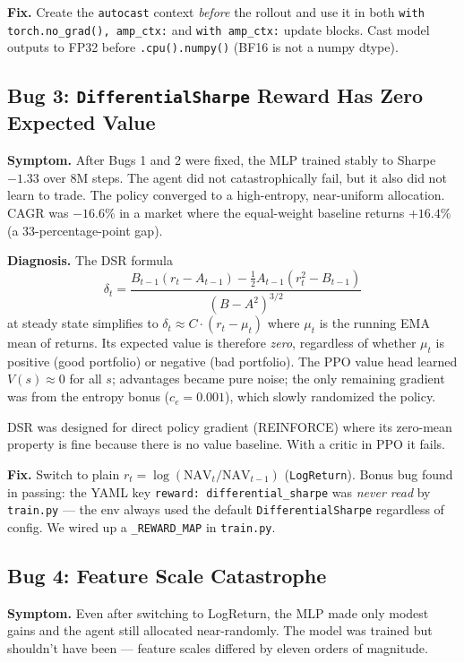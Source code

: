\documentclass[11pt,a4paper]{article}
\begin{document}
\textbf{Fix.} Create the \texttt{autocast} context \emph{before} the rollout and
use it in both \texttt{with torch.no\_grad(), amp\_ctx:} and \texttt{with amp\_ctx:}
update blocks. Cast model outputs to FP32 before \texttt{.cpu().numpy()} (BF16 is
not a numpy dtype).

\subsection{Bug 3: \texttt{DifferentialSharpe} Reward Has Zero Expected Value}

\textbf{Symptom.} After Bugs 1 and 2 were fixed, the MLP trained stably to
Sharpe $-1.33$ over 8M steps. The agent did not catastrophically fail, but it
also did not learn to trade. The policy converged to a high-entropy, near-uniform
allocation. CAGR was $-16.6\%$ in a market where the equal-weight baseline returns
$+16.4\%$ (a 33-percentage-point gap).

\textbf{Diagnosis.} The DSR formula
\[ \delta_t = \frac{B_{t-1} (r_t - A_{t-1}) - \tfrac{1}{2} A_{t-1} (r_t^2 - B_{t-1})}{(B - A^2)^{3/2}} \]
at steady state simplifies to $\delta_t \approx C \cdot (r_t - \mu_t)$ where $\mu_t$
is the running EMA mean of returns. Its expected value is therefore \emph{zero},
regardless of whether $\mu_t$ is positive (good portfolio) or negative (bad
portfolio). The PPO value head learned $V(s) \approx 0$ for all $s$; advantages
became pure noise; the only remaining gradient was from the entropy bonus
($c_e = 0.001$), which slowly randomized the policy.

DSR was designed for direct policy gradient (REINFORCE) where its zero-mean
property is fine because there is no value baseline. With a critic in PPO it
fails.

\textbf{Fix.} Switch to plain $r_t = \log(\text{NAV}_t / \text{NAV}_{t-1})$
(\texttt{LogReturn}). Bonus bug found in passing: the YAML key \texttt{reward:
differential\_sharpe} was \emph{never read} by \texttt{train.py} --- the env
always used the default \texttt{DifferentialSharpe} regardless of config. We wired
up a \texttt{\_REWARD\_MAP} in \texttt{train.py}.

\subsection{Bug 4: Feature Scale Catastrophe}

\textbf{Symptom.} Even after switching to LogReturn, the MLP made only modest
gains and the agent still allocated near-randomly. The model was trained but
shouldn't have been --- feature scales differed by eleven orders of magnitude.
\end{document}
